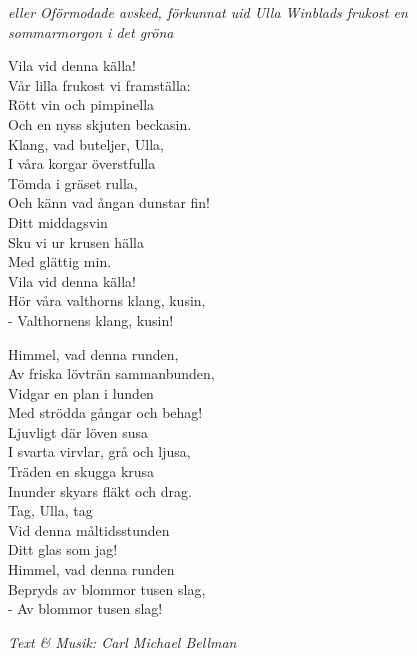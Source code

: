 {\footnotesize\textit{eller Oförmodade avsked, förkunnat uid Ulla Winblads 
frukost en\\sommarmorgon i det gröna}}\par
\vspace{10pt}
Vila vid denna källa!\\
Vår lilla frukost vi framställa:\\
Rött vin och pimpinella\\
Och en nyss skjuten beckasin.\\
Klang, vad buteljer, Ulla,\\
I våra korgar överstfulla\\
Tömda i gräset rulla,\\
Och känn vad ångan dunstar fin!\\
Ditt middagsvin\\
Sku vi ur krusen hälla\\
Med glättig min.\\
Vila vid denna källa!\\
Hör våra valthorns klang, kusin,\\
- Valthornens klang, kusin!\par
\newpage
Himmel, vad denna runden,\\
Av friska lövträn sammanbunden,\\
Vidgar en plan i lunden\\
Med strödda gångar och behag!\\
Ljuvligt där löven susa\\
I svarta virvlar, grå och ljusa,\\
Träden en skugga krusa\\
Inunder skyars fläkt och drag.\\
Tag, Ulla, tag\\
Vid denna måltidsstunden\\
Ditt glas som jag!\\
Himmel, vad denna runden\\
Bepryds av blommor tusen slag,\\
- Av blommor tusen slag!\par
\vspace{10pt}
{\footnotesize\textit{Text \& Musik: Carl Michael Bellman}}
